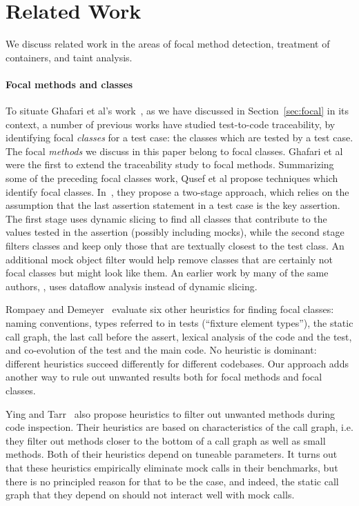 \section{Related Work}
\label{sec:related}

We discuss related work in the areas of focal method detection,
treatment of containers, and taint analysis.

\paragraph{Focal methods and classes} To situate Ghafari et al's work~\cite{ghafari15:_autom}, as we have discussed in Section~\ref{sec:focal} in its context, a number of previous works have studied test-to-code traceability, by identifying focal \emph{classes} for a test case: the classes which are tested by a test case. The focal \emph{methods} we discuss in this paper belong to focal classes. Ghafari et al were the first to extend the traceability study to focal methods. Summarizing some of the preceding focal classes work, Qusef et al propose techniques which identify focal classes. In~\cite{DBLP:conf/icsm/QusefBOLB11}, they propose a two-stage approach, which relies on the assumption that the last assertion statement in a test case is the key assertion. The first stage uses dynamic slicing to find all classes that contribute to the values tested in the assertion (possibly including mocks), while the second stage filters classes and keep only those that are textually closest to the test class. An additional mock object filter would help remove classes that are certainly not focal classes but might look like them. An earlier work by many of the same authors, \cite{DBLP:conf/icsm/QusefOL10}, uses dataflow analysis instead of dynamic slicing.

Rompaey and Demeyer~\cite{rompaey09:_estab_traceab_links_unit_test} evaluate six other heuristics for finding focal classes: naming conventions, types referred to in tests (``fixture element types''), the static call graph, the last call before the assert, lexical analysis of the code and the test, and co-evolution of the test and the main code. No heuristic is dominant: different heuristics succeed differently for different codebases. Our approach adds another way to rule out unwanted results both for focal methods and focal classes.

Ying and Tarr~\cite{DBLP:conf/eclipse/YingT07} also propose heuristics to filter out unwanted methods during code inspection. Their heuristics are based on characteristics of the call graph, i.e. they filter out methods closer to the bottom of a call graph as well as small methods. Both of their heuristics depend on tuneable parameters. It turns out that these heuristics empirically eliminate mock calls in their benchmarks, but there is no principled reason for that to be the case, and indeed, the static call graph that they depend on should not interact well with mock calls.

